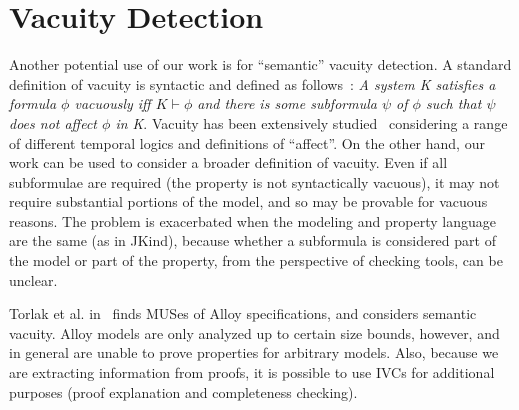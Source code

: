 \section{Vacuity Detection}
Another potential use of our work is for ``semantic'' vacuity detection.  A standard definition of vacuity is syntactic and defined as follows~\cite{Kupferman:2006:SCF}: {\em A system K satisfies a formula $\phi$ vacuously iff $K \vdash \phi$ and there is some subformula $\psi$ of $\phi$ such that $\psi$ does not affect $\phi$ in K}.  Vacuity has been extensively studied~\cite{Gurfinkel:2012:RVB,Chockler2008,DBLP:Ben-DavidK13,Kupferman:2006:SCF,Chockler:2007,Beer1997} considering a range of different temporal logics and definitions of ``affect''.  On the other hand, our work can be used to consider a broader definition of vacuity.  Even if all subformulae are required (the property is not syntactically vacuous), it may not require substantial portions of the model, and so may be provable for vacuous reasons.  The problem is exacerbated when the modeling and property language are the same (as in JKind), because whether a subformula is considered part of the model or part of the property, from the perspective of checking tools, can be unclear.

Torlak et al. in~\cite{Torlak08:cores} finds MUSes of Alloy
specifications, and considers semantic vacuity.
 Alloy models are only analyzed up to certain
size bounds, however, and in general are unable to prove properties
for arbitrary models. Also, because we are extracting information from
proofs, it is possible to use IVCs for additional purposes (proof
explanation and completeness checking).


